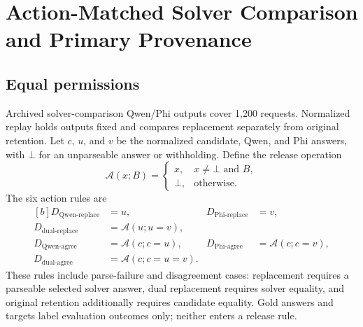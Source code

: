 \documentclass[journal,onecolumn]{IEEEtran}
\begin{document}
\section{Action-Matched Solver Comparison and Primary Provenance}
\label{sec:s9}
\subsection{Equal permissions}
Archived solver-comparison Qwen/Phi outputs cover 1,200 requests. Normalized replay holds outputs fixed and compares replacement separately from original retention.
Let $c$, $u$, and $v$ be the normalized candidate, Qwen, and Phi answers, with $\bot$ for an unparseable answer or withholding. Define the release operation
\begin{equation}
\mathcal A(x;B)=\begin{cases}x,&x\ne\bot\text{ and }B,\\\bot,&\text{otherwise}.\end{cases}
\label{eq:e4-release}
\end{equation}
The six action rules are
\begin{equation}
\begin{aligned}[b]
D_{\mathrm{Qwen\mbox{-}replace}}&=u,& D_{\mathrm{Phi\mbox{-}replace}}&=v,\\
D_{\mathrm{dual\mbox{-}replace}}&=\mathcal A(u;u=v),\\
D_{\mathrm{Qwen\mbox{-}agree}}&=\mathcal A(c;c=u),&
D_{\mathrm{Phi\mbox{-}agree}}&=\mathcal A(c;c=v),\\
D_{\mathrm{dual\mbox{-}agree}}&=\mathcal A(c;c=u=v).
\end{aligned}
\label{eq:e4-actions}
\end{equation}
These rules include parse-failure and disagreement cases: replacement requires a parseable selected solver answer, dual replacement requires solver equality, and original retention additionally requires candidate equality. Gold answers and targets label evaluation outcomes only; neither enters a release rule.
\end{document}
